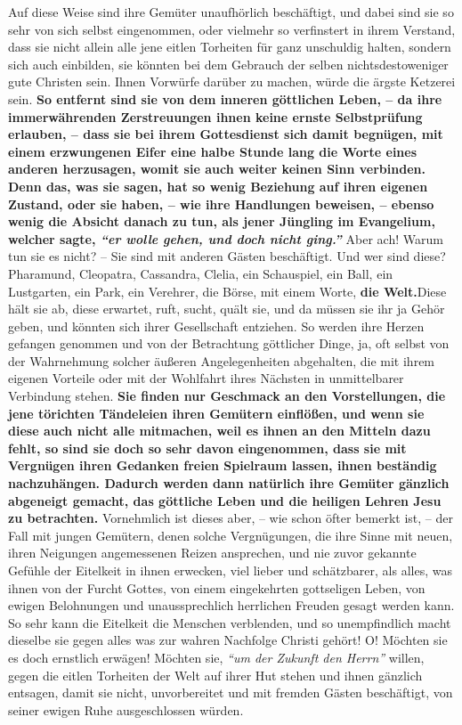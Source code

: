 Auf diese Weise sind ihre Gemüter unaufhörlich beschäftigt, und dabei sind sie
so sehr von sich selbst eingenommen, oder vielmehr so verfinstert in ihrem
Verstand, dass sie nicht allein alle jene eitlen Torheiten für ganz unschuldig
halten, sondern sich auch einbilden, sie könnten bei dem Gebrauch der selben
nichtsdestoweniger gute Christen sein. Ihnen
Vorwürfe
darüber zu machen, würde
die ärgste Ketzerei sein.
\label{ref:17_04_gottesdienst}
\textbf{So entfernt sind sie von dem inneren göttlichen Leben,
-- da ihre immerwährenden Zerstreuungen ihnen keine ernste
Selbstprüfung
erlauben, -- dass sie bei ihrem Gottesdienst
sich damit begnügen, mit einem
erzwungenen Eifer eine halbe Stunde lang die Worte eines anderen herzusagen,
womit sie auch weiter keinen Sinn verbinden. Denn das, was sie sagen, hat so
wenig Beziehung auf ihren eigenen Zustand, oder sie haben, -- wie ihre
Handlungen beweisen, -- ebenso wenig die Absicht danach zu tun, als jener
Jüngling im Evangelium, welcher sagte,
\textit{"`er wolle gehen, und doch nicht ging."'}}
Aber ach! Warum tun sie es nicht? -- Sie sind mit anderen Gästen beschäftigt.
Und wer sind diese? Pharamund,
Cleopatra, Cassandra,
Clelia, ein Schauspiel, ein
Ball, ein Lustgarten, ein Park, ein Verehrer, die Börse, mit einem
Worte, \textbf{die
Welt.}Diese hält sie ab, diese erwartet, ruft,
sucht, quält sie, und da müssen
sie ihr ja Gehör geben, und könnten sich ihrer Gesellschaft entziehen. So werden
ihre Herzen gefangen genommen und von der Betrachtung göttlicher Dinge, ja, oft
selbst von der Wahrnehmung solcher äußeren Angelegenheiten abgehalten, die mit
ihrem eigenen Vorteile oder mit der Wohlfahrt ihres Nächsten in unmittelbarer
Verbindung stehen. \textbf{Sie finden nur Geschmack an den Vorstellungen, die
jene
törichten Tändeleien ihren Gemütern einflößen, und wenn sie diese auch nicht
alle mitmachen, weil es ihnen an den Mitteln dazu fehlt, so sind sie doch so
sehr davon eingenommen, dass sie mit Vergnügen ihren Gedanken freien Spielraum
lassen, ihnen beständig nachzuhängen. Dadurch werden dann natürlich ihre
Gemüter gänzlich abgeneigt gemacht, das göttliche Leben und die heiligen Lehren
Jesu zu betrachten.} Vornehmlich ist dieses aber, -- wie schon öfter bemerkt
ist,
-- der Fall mit jungen Gemütern, denen solche Vergnügungen, die ihre Sinne mit
neuen, ihren Neigungen angemessenen Reizen ansprechen, und nie zuvor gekannte
Gefühle der Eitelkeit in ihnen erwecken, viel lieber und schätzbarer, als
alles, was ihnen von der Furcht Gottes, von einem eingekehrten gottseligen
Leben, von ewigen Belohnungen und unaussprechlich herrlichen Freuden gesagt
werden kann. So sehr kann die Eitelkeit die Menschen verblenden, und so
unempfindlich macht dieselbe sie gegen alles was zur wahren Nachfolge Christi
gehört! O! Möchten sie es doch ernstlich erwägen! Möchten sie,
\textit{"`um der Zukunft
den Herrn"'} willen, gegen die eitlen Torheiten der Welt auf ihrer Hut stehen
und ihnen gänzlich entsagen, damit sie nicht, unvorbereitet und mit fremden
Gästen beschäftigt, von seiner ewigen Ruhe ausgeschlossen würden.

